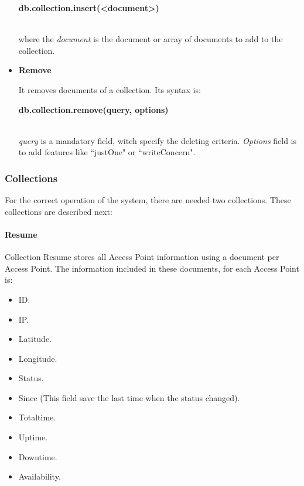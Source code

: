 \documentclass[12pt, a4paper,twoside]{tesi_upf}
\begin{document}
\begin{itemize}
            \centerline{\textbf{db.collection.insert(\textless document\textgreater)}}\\
            where the \textit{document} is the document or array of documents to add to the collection.
                
            \item \textbf{Remove}
            
            It removes documents of a collection. Its syntax is:\\
            
            \centerline{\textbf{db.collection.remove(query, options)}}\\
            
            \textit{query} is a mandatory field, witch specify the deleting criteria. \textit{Options} field is to add features like ``justOne" or ``writeConcern".
            
            
            \end{itemize}

            \subsubsection{Collections}
            
            For the correct operation of the system, there are needed two collections. These collections are described next:
            \paragraph{Resume}
            
            Collection Resume stores all Access Point information using a document per Access Point. The information included in these documents, for each Access Point is: 
            \begin{itemize}
            \item ID.
            \item IP.
            \item Latitude.
            \item Longitude.
            \item Status.
            \item Since (This field save the last time when the status changed).
            \item Totaltime.
            \item Uptime.
            \item Downtime.
            \item Availability.
            \end{itemize}
            
\end{document}

